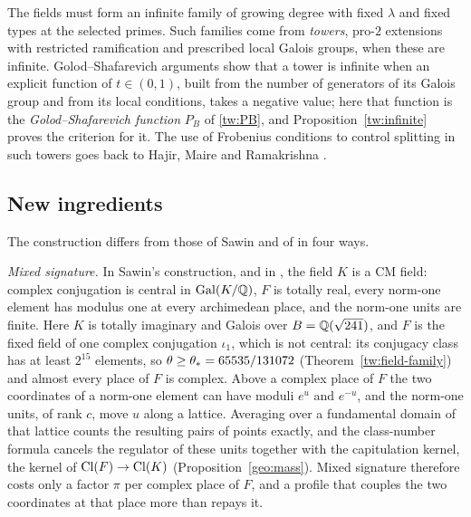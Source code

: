 The fields must form an infinite family of growing degree with fixed
$\lambda$ and fixed types at the selected primes. Such families come
from \emph{towers}, pro-$2$ extensions with restricted ramification and
prescribed local Galois groups, when these are infinite.
Golod--Shafarevich arguments \cite{GolodShafarevich} show that a tower
is infinite when an explicit function of $t\in(0,1)$, built from the
number of generators of its Galois group and from its local conditions,
takes a negative value; here that function is the
\emph{Golod--Shafarevich function} $P_B$ of \eqref{tw:PB}, and
Proposition~\ref{tw:infinite} proves the criterion for it. The use of
Frobenius conditions to control splitting in such towers goes back to Hajir, Maire and Ramakrishna
\cite{HajirMaireRamakrishna2021Cutting}.

\subsection{New ingredients}\label{intro:new}
The construction differs from those of Sawin \cite{Sawin2026} and of
\cite{Naslund0358} in four ways.

\emph{Mixed signature.} In Sawin's construction, and in
\cite{Naslund0358}, the field $K$ is a CM field: complex conjugation is
central in $\operatorname{Gal}(K/\mathbb Q)$, $F$ is totally real, every norm-one element has
modulus one at every archimedean place, and the norm-one units are
finite. Here $K$ is totally imaginary and Galois over $B=\mathbb Q(\sqrt{241})$,
and $F$ is the fixed field of one complex conjugation $\iota_1$, which is
not central: its conjugacy class has at least $2^{15}$ elements, so
$\theta\ge\theta_*=65535/131072$ (Theorem~\ref{tw:field-family}) and
almost every place of $F$ is complex. Above a
complex place of $F$ the two coordinates of a norm-one element can have
moduli $e^u$ and $e^{-u}$, and the norm-one units, of rank $c$, move $u$
along a lattice. Averaging over a fundamental domain of that lattice
counts the resulting pairs of points exactly, and the class-number
formula cancels the regulator of these units together with the
capitulation kernel, the kernel of $\operatorname{Cl}(F)\to\operatorname{Cl}(K)$
(Proposition~\ref{geo:mass}). Mixed signature therefore costs only
a factor $\pi$ per complex place of $F$, and a profile that couples the
two coordinates at that place more than repays it.

